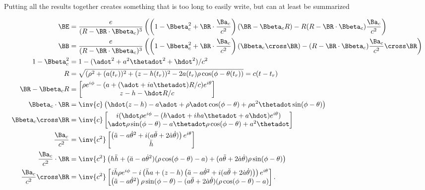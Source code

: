 {Putting all the results together creates something that is too long to easily write, but can at least be summarized

\begin{equation}\label{eqn:relativisticElectrodynamicsExamReflection:990}
\begin{aligned}
\BE 
&= 
\frac{e}{(R - \BR \cdot \Bbeta_c)^3}\left(
\left(1 - \Bbeta_c^2 + \BR \cdot \frac{\Ba_c}{c^2}
\right) (\BR - \Bbeta_c R)
- R(R - \BR \cdot \Bbeta_c) \frac{\Ba_c}{c^2} 
\right) \\
\BB 
&= 
\frac{e}{(R - \BR \cdot \Bbeta_c)^3}\left(
\left(1 - \Bbeta_c^2 + \BR \cdot \frac{\Ba_c}{c^2}
\right) (\Bbeta_c \cross \BR)
- (R - \BR \cdot \Bbeta_c) \frac{\Ba_c}{c^2} \cross \BR
\right) \\
1 - \Bbeta_c^2 &= 1 - (\adot^2 + a^2 \thetadot^2 + \hdot^2)/c^2 \\
R &= \sqrt{(\rho^2 + (a(t_r))^2 + (z-h(t_r))^2 - 2 a(t_r) \rho \cos(\phi - \theta(t_r))} = c( t - t_r) \\
\BR - \Bbeta_c R &= 
\begin{bmatrix}
\rho e^{i\phi} - (a + (\adot + i a\thetadot) R/c) e^{i\theta} \\
z - h - \hdot R/c
\end{bmatrix} \\
\Bbeta_c \cdot \BR &= \inv{c}\left( \hdot (z - h) -a \adot + \rho \adot \cos(\phi- \theta) + \rho a^2 \thetadot \sin(\phi - \theta) \right) \\
\Bbeta_c \cross \BR 
&=
\inv{c}
\begin{bmatrix}
i( \hdot \rho e^{i\phi} - (h \adot + i h a \thetadot + a \hdot) e^{i\theta} ) \\
\adot \rho \sin(\phi - \theta) - a \thetadot \rho \cos(\phi - \theta) + a^2 \thetadot
\end{bmatrix} \\
\frac{\Ba_c}{c^2} &=
\inv{c^2}
\begin{bmatrix}
\left( \ddot{a} - a {\dot{\theta}}^2 + i ( a\ddot{\theta} + 2 \dot{a} \dot{\theta} ) \right) e^{i\theta} \\
\ddot{h}
\end{bmatrix} \\
\frac{\Ba_c}{c^2} \cdot \BR &=
\inv{c^2} \left(
h \ddot{h} + 
( \ddot{a} - a {\dot{\theta}}^2 ) (\rho \cos(\phi - \theta) - a)
+ (a \ddot{\theta} + 2 \dot{a} \dot{\theta}) \rho \sin(\phi - \theta) \right) \\
\frac{\Ba_c}{c^2} \cross \BR 
&=
\inv{c^2}
\begin{bmatrix}
i \ddot{h} \rho e^{i\phi} 
- i \left( \ddot{h} a + (z - h) \left( \ddot{a} - a {\dot{\theta}}^2 + i ( a\ddot{\theta} + 2 \dot{a} \dot{\theta} ) \right) \right) e^{i\theta} \\
\left( \ddot{a} - a {\dot{\theta}}^2 \right) \rho \sin(\phi - \theta)
-( a\ddot{\theta} + 2 \dot{a} \dot{\theta} ) (\rho \cos(\phi -\theta) - a)
\end{bmatrix}.
\end{aligned}
\end{equation}

}
